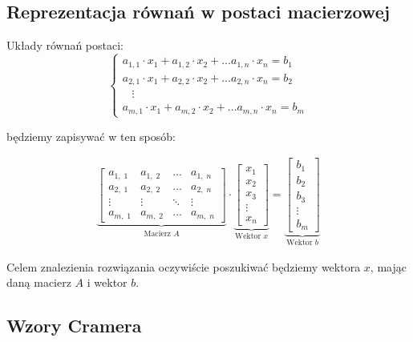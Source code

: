 \subsection{Reprezentacja równań w postaci macierzowej}

Układy równań postaci:
\[
	\begin{cases}
		a_{1,1} \cdot x_1 + a_{1, 2} \cdot x_2 + \dots a_{1,n} \cdot x_n = b_1 \\
		a_{2,1} \cdot x_1 + a_{2, 2} \cdot x_2 + \dots a_{2,n} \cdot x_n = b_2 \\
		\hspace{10pt} \vdots                                                   \\
		a_{m,1} \cdot x_1 + a_{m, 2} \cdot x_2 + \dots a_{m,n} \cdot x_n = b_m
	\end{cases}
\]

będziemy zapisywać w ten sposób:

\begin{align*}
	\underbrace{
		\begin{bmatrix}
			a_{1, \; 1} & a_{1, \; 2} & \dots  & a_{1,\; n}  \\
			a_{2, \; 1} & a_{2, \; 2} & \dots  & a_{2,\; n}  \\
			\vdots      & \vdots      & \ddots & \vdots      \\
			a_{m, \; 1} & a_{m, \; 2} & \dots  & a_{m, \; n}
		\end{bmatrix}
	}_{\text{Macierz \(A\)}}
	\cdot
	\underbrace{
		\begin{bmatrix}
			x_1 \\ x_2 \\ x_3 \\ \vdots \\ x_n
		\end{bmatrix}
	}_{\text{Wektor \(x\)}}
	=
	\underbrace{
		\begin{bmatrix}
			b_1 \\ b_2 \\ b_3 \\ \vdots \\ b_m
		\end{bmatrix}
	}_{\text{Wektor \(b\)}}
\end{align*}

Celem znalezienia rozwiązania oczywiście poszukiwać będziemy wektora \(x\), mając daną macierz \(A\) i wektor \(b\).

\subsection{Wzory Cramera}

